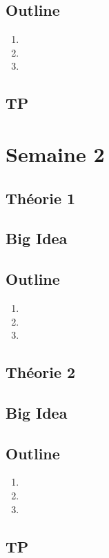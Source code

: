 \documentclass{article}
\begin{document}
\subsection*{Outline}
    \begin{enumerate}
    \item
    \item
    \item
    \end{enumerate}
\subsection{TP}

\pagebreak

\section{Semaine 2}
\subsection{Théorie 1}
\subsection*{Big Idea}
\subsection*{Outline}
    \begin{enumerate}
    \item
    \item
    \item
    \end{enumerate}
\subsection{Théorie 2}
\subsection*{Big Idea}
\subsection*{Outline}
    \begin{enumerate}
    \item
    \item
    \item
    \end{enumerate}
\subsection{TP}
\end{document}
